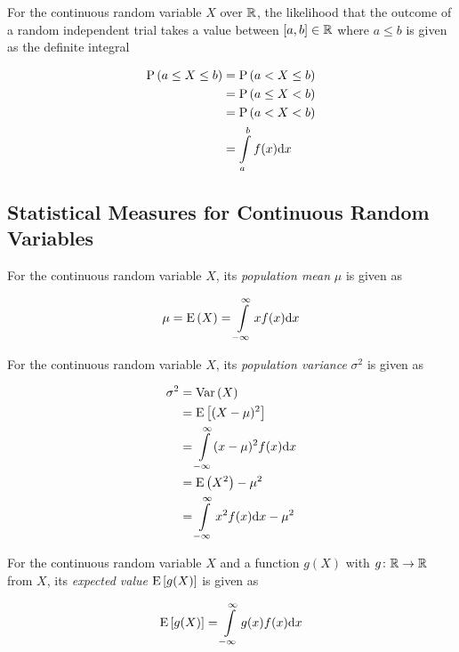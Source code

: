\begin{definition}
    For the continuous random variable $X$ over $\mathbb{R}$, the likelihood that the outcome of a random independent trial takes a value between $[a, b] \in \mathbb{R}$ where $a \le b$ is given as the definite integral
    
    \begin{align}
        \mathrm{P} \left( a \le X \le b \right)
        &= \mathrm{P} \left( a < X \le b \right) \\
        &= \mathrm{P} \left( a \le X < b \right) \\
        &= \mathrm{P} \left( a < X < b \right) \\
        &= \int \limits_{a}^{b} f(x) \dd x
    \end{align}
\end{definition}

\subsection{Statistical Measures for Continuous Random Variables}

\begin{definition}
    For the continuous random variable $X$, its \textit{population mean} $\mu$ is given as
    
    \begin{equation}
        \mu
        = \mathrm{E} \left( X \right)
        = \int \limits_{-\infty}^{\infty} x f(x) \dd x
    \end{equation}
\end{definition}

\begin{definition}
    For the continuous random variable $X$, its \textit{population variance} $\sigma^2$ is given as
    
    \begin{align}
        \sigma^2
        &= \mathrm{Var} \left( X \right) \\
        &= \mathrm{E} \left[ (X - \mu)^2 \right] \\
        &= \int \limits_{-\infty}^{\infty} (x - \mu)^2 f(x) \dd x \\
        &= \mathrm{E} \left( X^2 \right) - \mu^2 \\
        &= \int \limits_{-\infty}^{\infty} x^2 f(x) \dd x - \mu^2
    \end{align}
\end{definition}

\begin{definition}
    For the continuous random variable $X$ and a function $g(X)$ with $g \colon \mathbb{R} \to \mathbb{R}$ from $X$, its \textit{expected value} $\mathrm{E} \left[ g(X) \right]$ is given as
    
    \begin{equation}
        \mathrm{E} \left[ g(X) \right]
        = \int \limits_{-\infty}^{\infty} g(x) f(x) \dd x
    \end{equation}
\end{definition}

